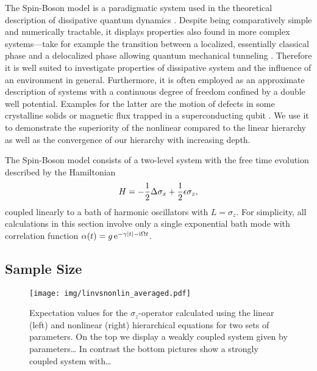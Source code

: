 The Spin-Boson model is a paradigmatic system used in the theoretical description of dissipative quantum dynamics \cite{Le87_spinboson,We99_dissipative_systems}.
Despite being comparatively simple and numerically tractable, it displays properties also found in more complex systems---take for example the transition between a localized, essentially classical phase and a delocalized phase allowing quantum mechanical tunneling \cite{FlVeNa10_spin_boson}.
Therefore it is well suited to investigate properties of dissipative system and the influence of an environment in general.
Furthermore, it is often employed as an approximate description of systems with a continuous degree of freedom confined by a double well potential.
Examples for the latter are the motion of defects in some crystalline solids or magnetic flux trapped in a superconducting qubit \cite{CaLe83_diss_system}.
We use it to demonstrate the superiority of the nonlinear compared to the linear hierarchy as well as the convergence of our hierarchy with increasing depth.

The Spin-Boson model consists of a two-level system with the free time evolution described by the Hamiltonian
\begin{equation*}
  H = - \frac{1}{2}\Delta \sigma_x + \frac{1}{2} \epsilon \sigma_z,
\end{equation*}
coupled linearly to a bath of harmonic oscillators with $L=\sigma_z$.
For simplicity, all calculations in this section involve only a single exponential bath mode with correlation function $\alpha(t) = g \,\exp[-\gamma \abs{t} - \ii\Omega t]$.


\subsection{Sample Size}
\label{sub:num.spin_boson.sample_size}
%

\begin{figure}[p]
  \centering
  \texttt{[image: img/linvsnonlin\_averaged.pdf]}
  \caption{%
    Expectation values for the $\sigma_z$-operator calculated using the linear (left) and nonlinear (right) hierarchical equations for two sets of parameters.
    On the top we display a weakly coupled system given by parameters\dots
    In contrast the bottom pictures show a strongly coupled system with\dots
  }
  \label{fig:num.linvsnonlin}
\end{figure}

